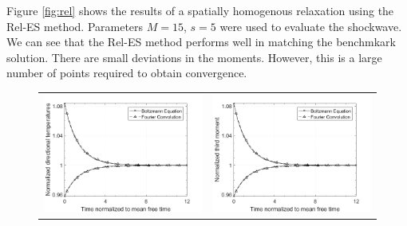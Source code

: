 \documentclass[12pt]{CSUNthesis}
\begin{document}
Figure \ref{fig:rel} shows the results of a spatially homogenous relaxation using the Rel-ES method. Parameters $M=15$, $s=5$ were used to evaluate the shockwave. We can see that the Rel-ES method performs well in matching the benchmkark solution. There are small deviations in the moments. However, this is a large number of points required to obtain convergence. 

\begin{center}
\begin{figure}[h]
\centering
  \begin{tabular}{@{}cc@{}}
  \includegraphics[height=.25\textheight]{images/reles_m155_5s15n_mom2.png}&
  \includegraphics[height=.25\textheight]{images/reles_m155_5s15n_mom3.png}\\      

\end{tabular}
\end{figure}
\end{center}
\end{document}
